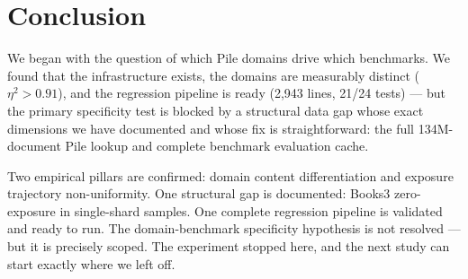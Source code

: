 \section{Conclusion}

We began with the question of which Pile domains drive which benchmarks. We found that the infrastructure exists, the domains are measurably distinct ($\eta^2>0.91$), and the regression pipeline is ready (2,943 lines, 21/24 tests) --- but the primary specificity test is blocked by a structural data gap whose exact dimensions we have documented and whose fix is straightforward: the full 134M-document Pile lookup and complete benchmark evaluation cache.

Two empirical pillars are confirmed: domain content differentiation and exposure trajectory non-uniformity. One structural gap is documented: Books3 zero-exposure in single-shard samples. One complete regression pipeline is validated and ready to run. The domain-benchmark specificity hypothesis is not resolved --- but it is precisely scoped. The experiment stopped here, and the next study can start exactly where we left off.
